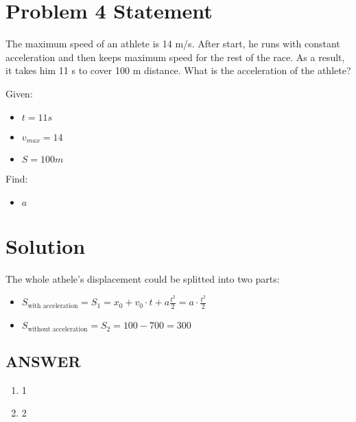 \section*{Problem 4 Statement}

The maximum speed of an athlete is 14 m/s. After start, he runs with constant acceleration and
then keeps maximum speed for the rest of the race. As a result, it takes him 11 s to cover 100 m
distance. What is the acceleration of the athlete?

\bigbreak Given:

\begin{itemize}
    \item $t = 11s$
    \item $v_{max} = 14$
    \item $S = 100m$
\end{itemize}

\bigbreak Find:

\begin{itemize}
    \item $a$
\end{itemize}

\section*{Solution}

The whole athele's displacement could be splitted into two parts:

\begin{itemize}
    \item $S_{\text{with acceleration}} = S_1 = x_0 + v_0 \cdot t + a \frac{t^2}{2} = a \cdot \frac{t^2}{2}$
    \item $ S_{\text{without acceleration}} = S_2 = 100 - 700 = 300$
\end{itemize}

\vfill \subsection*{ANSWER}
\begin{enumerate}
    \item 1
    \item 2
\end{enumerate}
